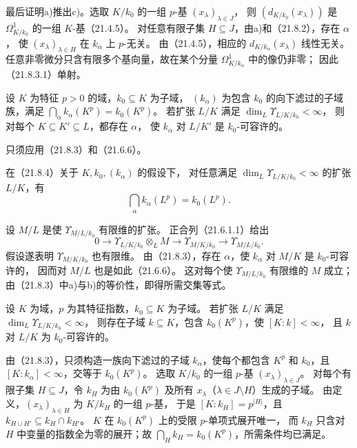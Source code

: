 最后证明a)推出c)。选取 $K/k_0$ 的一组 $p$-基 $(x_\lambda)_{\lambda\in J}$，
则 $(d_{K/k_0}(x_\lambda))$ 是 $\Omega^1_{K/k_0}$ 的一组 $K$-基（21.4.5）。
对任意有限子集 $H\subseteq J$，由a)和（21.8.2），存在 $\alpha$，
使 $(x_\lambda)_{\lambda\in H}$ 在 $k_\alpha$ 上 $p$-无关。
由（21.4.5），相应的 $d_{K/k_\alpha}(x_\lambda)$ 线性无关。
任意非零微分只含有限多个基向量，故在某个分量 $\Omega^1_{K/k_\alpha}$ 中的像仍非零；
因此（21.8.3.1）单射。
\finishproof

设 $K$ 为特征 $p>0$ 的域，$k_0\subseteq K$ 为子域，
$(k_\alpha)$ 为包含 $k_0$ 的向下滤过的子域族，满足
$\bigcap_\alpha k_\alpha(K^p)=k_0(K^p)$。
若扩张 $L/K$ 满足 $\dim_L\Upsilon_{L/K/k_0}<\infty$，
则对每个 $K\subseteq K'\subseteq L$，都存在 $\alpha$，
使 $k_\alpha$ 对 $L/K'$ 是 $k_0$-可容许的。

只须应用（21.8.3）和（21.6.6）。

在（21.8.4）关于 $K,k_0,(k_\alpha)$ 的假设下，
对任意满足 $\dim_L\Upsilon_{L/K/k_0}<\infty$ 的扩张 $L/K$，有
\[
 \bigcap_\alpha k_\alpha(L^p)=k_0(L^p).
\]

\eproof
设 $M/L$ 是使 $\Upsilon_{M/L/k_0}$ 有限维的扩张。
正合列（21.6.1.1）给出
\[
 0\longrightarrow\Upsilon_{L/K/k_0}\otimes_LM
 \longrightarrow\Upsilon_{M/K/k_0}
 \longrightarrow\Upsilon_{M/L/k_0}.
\]
假设遂表明 $\Upsilon_{M/K/k_0}$ 也有限维。
由（21.8.3），存在 $\alpha$，使 $k_\alpha$ 对 $M/K$ 是 $k_0$-可容许的，
因而对 $M/L$ 也是如此（21.6.6）。
这对每个使 $\Upsilon_{M/L/k_0}$ 有限维的 $M$ 成立；
由（21.8.3）中a)与b)的等价性，即得所需交集等式。
\finishproof

设 $K$ 为域，$p$ 为其特征指数，$k_0\subseteq K$ 为子域。
若扩张 $L/K$ 满足 $\dim_L\Upsilon_{L/K/k_0}<\infty$，
则存在子域 $k\subseteq K$，包含 $k_0(K^p)$，使 $[K:k]<\infty$，
且 $k$ 对 $L/K$ 为 $k_0$-可容许的。

\eproof
由（21.8.3），只须构造一族向下滤过的子域 $k_\alpha$，使每个都包含
$K^p$ 和 $k_0$，且 $[K:k_\alpha]<\infty$，交等于 $k_0(K^p)$。
选取 $K/k_0$ 的一组 $p$-基 $(x_\lambda)_{\lambda\in J}$。
对每个有限子集 $H\subseteq J$，令 $k_H$ 为由 $k_0(K^p)$ 及所有
$x_\lambda$（$\lambda\in J\setminus H$）生成的子域。
由定义，$(x_\lambda)_{\lambda\in H}$ 为 $K/k_H$ 的一组 $p$-基，
于是 $[K:k_H]=p^{|H|}$，且 $k_{H\cup H'}\subseteq k_H\cap k_{H'}$。
$K$ 在 $k_0(K^p)$ 上的受限 $p$-单项式展开唯一，
而 $k_H$ 只含对 $H$ 中变量的指数全为零的展开；故
$\bigcap_Hk_H=k_0(K^p)$，所需条件均已满足。
\finishproof

